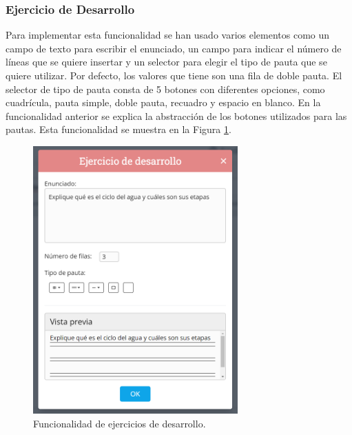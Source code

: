 \subsubsection{Ejercicio de Desarrollo}
\label{sec:impdesarrollo}
Para implementar esta funcionalidad se han usado varios elementos como un campo de texto para escribir el enunciado, un campo para indicar el número de líneas que se quiere insertar y un selector para elegir el tipo de pauta que se quiere utilizar. Por defecto, los valores que tiene son una fila de doble pauta. El selector de tipo de pauta consta de 5 botones con diferentes opciones, como cuadrícula, pauta simple, doble pauta, recuadro y espacio en blanco. En la funcionalidad anterior se explica la abstracción de los botones utilizados para las pautas. Esta funcionalidad se muestra en la Figura \ref{fig:funcionalidadDesarrollo}.

\begin{figure}[ht!]
  \centering
  \includegraphics[width=0.7\textwidth]{Imagenes/Funcionalidades/DesarrolloModal.PNG}
  \caption{Funcionalidad de ejercicios de desarrollo.}
  \label{fig:funcionalidadDesarrollo}
\end{figure}

